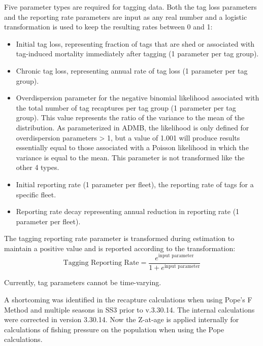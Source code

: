 Five parameter types are required for tagging data. Both the tag loss parameters and the reporting rate parameters are input as any real number and a logistic transformation is used to keep the resulting rates between 0 and 1:
\begin{itemize}
	\item Initial tag loss, representing fraction of tags that are shed or associated with tag-induced mortality immediately after tagging (1 parameter per tag group). 
	\item Chronic tag loss, representing annual rate of tag loss (1 parameter per tag group).
	\item Overdispersion parameter for the negative binomial likelihood associated with the total number of tag recaptures per tag group (1 parameter per tag group). This value represents the ratio of the variance to the mean of the distribution. As parameterized in ADMB, the likelihood is only defined for overdispersion parameters > 1, but a value of 1.001 will produce results essentially equal to those associated with a Poisson likelihood in which the variance is equal to the mean. This parameter is not transformed like the other 4 types.
	\item Initial reporting rate (1 parameter per fleet), the reporting rate of tags for a specific fleet.
	\item Reporting rate decay representing annual reduction in reporting rate (1 parameter per fleet).
\end{itemize}

The tagging reporting rate parameter is transformed during estimation to maintain a positive value and is reported according to the transformation:
\begin{equation}
	\text{Tagging Reporting Rate} = \frac{e^{\text{input parameter}}}{1+e^{\text{input parameter}}}
\end{equation}

Currently, tag parameters cannot be time-varying.

A shortcoming was identified in the recapture calculations when using Pope's F Method and multiple seasons in SS3 prior to v.3.30.14. The internal calculations were corrected in version 3.30.14. Now the Z-at-age is applied internally for calculations of fishing pressure on the population when using the Pope calculations.

